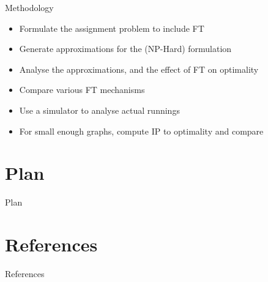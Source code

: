 \documentclass{beamer}
\begin{document}
\begin{frame}{Methodology}
\begin{itemize}
	\item Formulate the assignment problem to include FT
	\item Generate approximations for the (NP-Hard) formulation
	\item Analyse the approximations, and the effect of FT on optimality
	\item Compare various FT mechanisms
	\item Use a simulator to analyse actual runnings
	\item For small enough graphs, compute IP to optimality and compare
\end{itemize}
\end{frame}

\section{Plan}

\begin{frame}{Plan}
\end{frame}

\section{References}

\begin{frame}[allowframebreaks]{References}


\end{frame}
\end{document}
